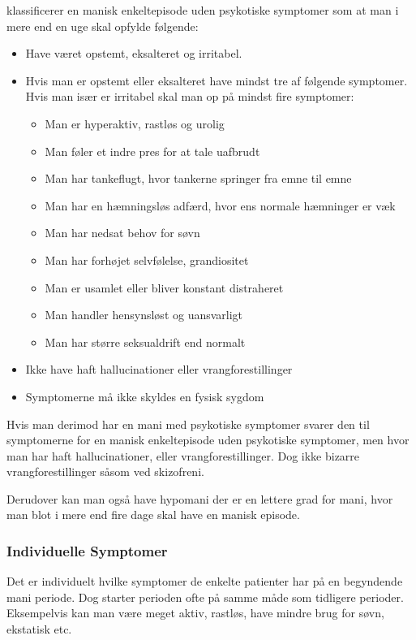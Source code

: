 \citet{misc:netpsykmani} klassificerer en manisk enkeltepisode uden psykotiske symptomer som at man i mere end en uge skal opfylde følgende:
\begin{itemize}
	\item Have været opstemt, eksalteret og irritabel.
	\item Hvis man er opstemt eller eksalteret have mindst tre af følgende symptomer. Hvis man især er irritabel skal man op på mindst fire symptomer:
	\begin{itemize}
		\item Man er hyperaktiv, rastløs og urolig
		\item Man føler et indre pres for at tale uafbrudt
		\item Man har tankeflugt, hvor tankerne springer fra emne til emne
		\item Man har en hæmningsløs adfærd, hvor ens normale hæmninger er væk
		\item Man har nedsat behov for søvn
		\item Man har forhøjet selvfølelse, grandiositet
		\item Man er usamlet eller bliver konstant distraheret
		\item Man handler hensynsløst og uansvarligt
		\item Man har større seksualdrift end normalt
	\end{itemize}
	\item Ikke have haft hallucinationer eller vrangforestillinger
	\item Symptomerne må ikke skyldes en fysisk sygdom
\end{itemize}
Hvis man derimod har en mani med psykotiske symptomer svarer den til symptomerne for en manisk enkeltepisode uden psykotiske symptomer, men hvor man har haft hallucinationer, eller vrangforestillinger. Dog ikke bizarre vrangforestillinger såsom ved skizofreni.

Derudover kan man også have hypomani der er en lettere grad for mani, hvor man blot i mere end fire dage skal have en manisk episode.

\subsubsection{Individuelle Symptomer}
Det er individuelt hvilke symptomer de enkelte patienter har på en begyndende mani periode.
Dog starter perioden ofte på samme måde som tidligere perioder.
Eksempelvis kan man være meget aktiv, rastløs, have mindre brug for søvn, ekstatisk etc.

